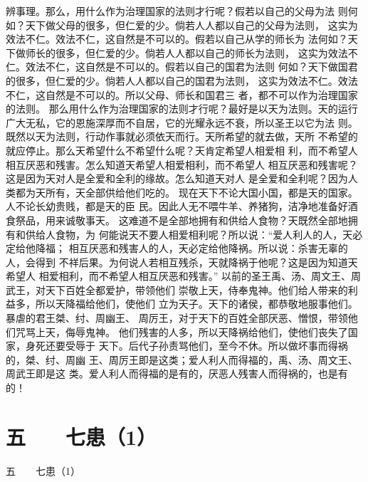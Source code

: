\documentclass[12pt,UTF8]{ctexbook}
\begin{document}
辨事理。那么，用什么作为治理国家的法则才行呢？假若以自己的父母为法 
则何如？天下做父母的很多，但仁爱的少。倘若人人都以自己的父母为法则， 
这实为效法不仁。效法不仁，这自然是不可以的。假若以自己从学的师长为 
法何如？天下做师长的很多，但仁爱的少。倘若人人都以自己的师长为法则， 
这实为效法不仁。效法不仁，这自然是不可以的。假若以自己的国君为法则 
何如？天下做国君的很多，但仁爱的少。倘若人人都以自己的国君为法则， 
这实为效法不仁。效法不仁，这自然是不可以的。所以父母、师长和国君三 
者，都不可以作为治理国家的法则。 
那么用什么作为治理国家的法则才行呢？最好是以天为法则。天的运行 
广大无私，它的恩施深厚而不自居，它的光耀永远不衰，所以圣王以它为法 
则。既然以天为法则，行动作事就必须依天而行。天所希望的就去做，天所 
不希望的就应停止。那么天希望什么不希望什么呢？天肯定希望人相爱相 
利，而不希望人相互厌恶和残害。怎么知道天希望人相爱相利，而不希望人 
相互厌恶和残害呢？这是因为天对人是全爱和全利的缘故。怎么知道天对人 
是全爱和全利呢？因为人类都为天所有，天全部供给他们吃的。 
现在天下不论大国小国，都是天的国家。人不论长幼贵贱，都是天的臣 
民。因此人无不喂牛羊、养猪狗，洁净地准备好酒食祭品，用来诚敬事天。 
这难道不是全部地拥有和供给人食物？天既然全部地拥有和供给人食物，为 
何能说天不要人相爱相利呢？所以说：“爱人利人的人，天必定给他降福； 
相互厌恶和残害人的人，天必定给他降祸。所以说：杀害无辜的人，会得到 
不祥后果。为何说人若相互残杀，天就降祸于他呢？这是因为知道天希望人 
相爱相利，而不希望人相互厌恶和残害。” 
以前的圣王禹、汤、周文王、周武王，对天下百姓全都爱护，带领他们 
崇敬上天，侍奉鬼神。他们给人带来的利益多，所以天降福给他们，使他们 
立为天子。天下的诸侯，都恭敬地服事他们。暴虐的君王桀、纣、周幽王、 
周厉王，对于天下的百姓全部厌恶、憎恨，带领他们咒骂上天，侮辱鬼神。 
他们残害的人多，所以天降祸给他们，使他们丧失了国家，身死还要受辱于 
天下。后代子孙责骂他们，至今不休。所以做坏事而得祸的，桀、纣、周幽 
王、周厉王即是这类；爱人利人而得福的，禹、汤、周文王、周武王即是这 
类。爱人利人而得福的是有的，厌恶人残害人而得祸的，也是有的！ 


\chapter{五　　七患（1）}
五　　七患（1）
\end{document}
